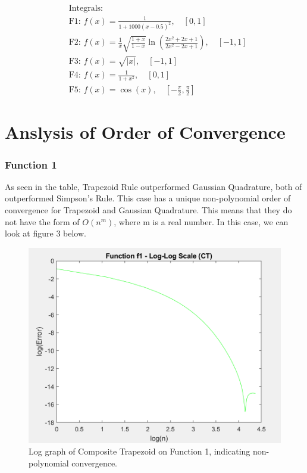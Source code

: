 \documentclass[12pt]{article}
\begin{document}
\begin{align*}
	 & \text{Integrals:}                                                                                                         \\
	 & \text{F1: }f(x) = \frac{1}{1 + 1000(x - 0.5)^2}, \quad [0, 1]                                                             \\
	 & \text{F2: }f(x) = \frac{1}{x}\sqrt{\frac{1 + x}{1 - x}}\ln\left(\frac{2x^2 + 2x + 1}{2x^2 - 2x + 1}\right), \quad [-1, 1] \\
	 & \text{F3: }f(x) = \sqrt{|x|}, \quad [-1, 1]                                                                               \\
	 & \text{F4: }f(x) = \frac{1}{1 + x^2}, \quad [0, 1]                                                                         \\
	 & \text{F5: }f(x) = \cos(x), \quad [-\frac{\pi}{2}, \frac{\pi}{2}]
\end{align*}

\section{Anslysis of Order of Convergence}

\subsubsection{Function 1}

As seen in the table, Trapezoid Rule outperformed Gaussian Quadrature, both of
outperformed Simpson's Rule. This case has a
unique non-polynomial order of convergence for Trapezoid and Gaussian
Quadrature. This means that they do not have the form of $O(n^m)$, where m is a
real number. In this case, we can look at figure 3 below. 

\begin{figure}[htbp]
	\centering
	\begin{minipage}[b]{0.45\textwidth}
		\includegraphics[width=\textwidth]{../images/CT-f1-logspace.png} %
		\caption{Log graph of Composite Trapezoid on Function 1, indicating non-polynomial convergence.}
	\end{minipage}
\end{figure}
\end{document}
